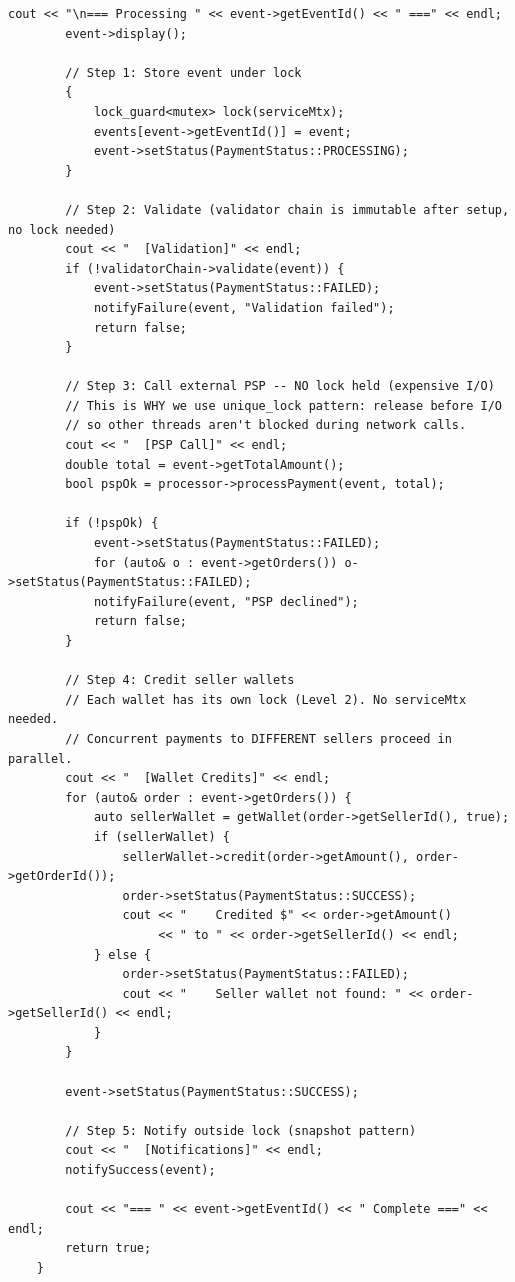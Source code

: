 \documentclass[11pt,a4paper]{article}
\begin{document}
\begin{lstlisting}[title={\texttt{managers.hpp}}]
        cout << "\n=== Processing " << event->getEventId() << " ===" << endl;
        event->display();

        // Step 1: Store event under lock
        {
            lock_guard<mutex> lock(serviceMtx);
            events[event->getEventId()] = event;
            event->setStatus(PaymentStatus::PROCESSING);
        }

        // Step 2: Validate (validator chain is immutable after setup, no lock needed)
        cout << "  [Validation]" << endl;
        if (!validatorChain->validate(event)) {
            event->setStatus(PaymentStatus::FAILED);
            notifyFailure(event, "Validation failed");
            return false;
        }

        // Step 3: Call external PSP -- NO lock held (expensive I/O)
        // This is WHY we use unique_lock pattern: release before I/O
        // so other threads aren't blocked during network calls.
        cout << "  [PSP Call]" << endl;
        double total = event->getTotalAmount();
        bool pspOk = processor->processPayment(event, total);

        if (!pspOk) {
            event->setStatus(PaymentStatus::FAILED);
            for (auto& o : event->getOrders()) o->setStatus(PaymentStatus::FAILED);
            notifyFailure(event, "PSP declined");
            return false;
        }

        // Step 4: Credit seller wallets
        // Each wallet has its own lock (Level 2). No serviceMtx needed.
        // Concurrent payments to DIFFERENT sellers proceed in parallel.
        cout << "  [Wallet Credits]" << endl;
        for (auto& order : event->getOrders()) {
            auto sellerWallet = getWallet(order->getSellerId(), true);
            if (sellerWallet) {
                sellerWallet->credit(order->getAmount(), order->getOrderId());
                order->setStatus(PaymentStatus::SUCCESS);
                cout << "    Credited $" << order->getAmount()
                     << " to " << order->getSellerId() << endl;
            } else {
                order->setStatus(PaymentStatus::FAILED);
                cout << "    Seller wallet not found: " << order->getSellerId() << endl;
            }
        }

        event->setStatus(PaymentStatus::SUCCESS);

        // Step 5: Notify outside lock (snapshot pattern)
        cout << "  [Notifications]" << endl;
        notifySuccess(event);

        cout << "=== " << event->getEventId() << " Complete ===" << endl;
        return true;
    }


\end{lstlisting}
\end{document}
